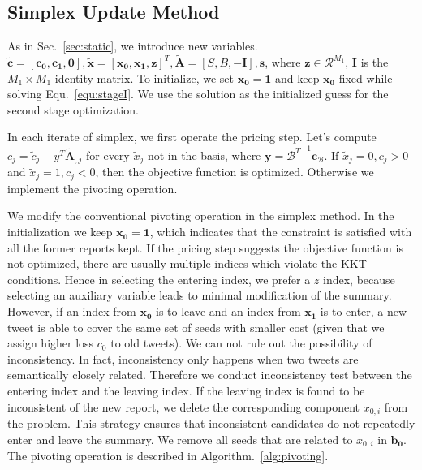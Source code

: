 \documentclass[runningheads]{llncs}
\begin{document}
\subsection{Simplex Update Method}

As in Sec.~\ref{sec:static}, we introduce new variables.  $\tilde{\mathbf{c}}=[\mathbf{c_0},\mathbf{c_1}, \mathbf{0}],\tilde{\mathbf{x}}=[\mathbf{x_0},\mathbf{x_1},\mathbf{z}]^T,\tilde{\mathbf{A}}=[S,B,-\mathbf{I}],\mathbf{s}$, where $\mathbf{z}\in\mathcal{R}^{M_1}$, $ \mathbf{I}$ is the $M_1\times M_1$ identity matrix. To initialize, we set  $\mathbf{x_0}=\mathbf{1}$ and keep $\mathbf{x_0}$ fixed while solving Equ.~\ref{equ:stageI}. We use the solution as the initialized guess for the second stage optimization.

In each iterate of simplex, we first operate the pricing step.  Let's compute $\bar{c}_j = \tilde{c}_j - y^T\tilde{\mathbf{A}}_{,j}$ for every $\tilde{x}_j$ not in the basis, where $\mathbf{y} = {\mathcal{B}^T}^{-1}\mathbf{c_\mathcal{B}}$. If $\tilde{x}_j = 0, \bar{c}_j > 0$ and $\tilde{x}_j = 1,\bar{c}_j < 0$, then the objective function is optimized. Otherwise we implement the pivoting operation.

We modify the conventional pivoting operation in the simplex method. In the initialization we keep $\mathbf{x_0}=\mathbf{1}$, which indicates that the constraint is satisfied with all the former reports kept. If the pricing step suggests the objective function is not optimized, there are usually multiple indices which violate the KKT conditions.  Hence in selecting the entering index, we prefer a $z$ index, because selecting an auxiliary variable leads to minimal modification of the summary. However, if an index from $\mathbf{x_0}$ is to leave and an index from $\mathbf{x_1}$ is to enter, a new tweet is able to cover the same set of seeds with smaller cost (given that we assign higher loss $c_0$ to old tweets). We can not rule out the possibility of inconsistency. In fact, inconsistency only happens when two tweets are semantically closely related. Therefore we conduct inconsistency test between the entering index and the leaving index. If the leaving index is found to be inconsistent of the new report, we delete the corresponding component $x_{0,i}$ from the problem. This strategy ensures that inconsistent candidates do not repeatedly enter and leave the summary. We remove all seeds that are related to $x_{0,i}$ in $\mathbf{b_0}$. The pivoting operation is described in Algorithm.~\ref{alg:pivoting}.
\end{document}
